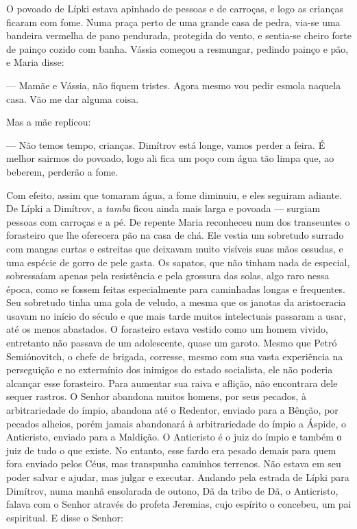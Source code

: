 O povoado de Lípki estava apinhado de pessoas e de carroças, e logo as
crianças ficaram com fome. Numa praça perto de uma grande casa de pedra,
via-se uma bandeira vermelha de pano pendurada, protegida do vento, e
sentia-se cheiro forte de painço cozido com banha. Vássia começou a
resmungar, pedindo painço e pão, e Maria disse:

--- Mamãe e Vássia, não fiquem tristes. Agora mesmo vou pedir esmola
naquela casa. Vão me dar alguma coisa.

Mas a mãe replicou:

--- Não temos tempo, crianças. Dimítrov está longe, vamos perder a
feira. É melhor sairmos do povoado, logo ali fica um poço com água tão
limpa que, ao beberem, perderão a fome.

Com efeito, assim que tomaram água, a fome diminuiu, e eles seguiram
adiante. De Lípki a Dimítrov, a \emph{tamba} ficou ainda mais larga e
povoada --- surgiam pessoas com carroças e a pé. De repente Maria
reconheceu num dos transeuntes o forasteiro que lhe oferecera pão na
casa de chá. Ele vestia um sobretudo surrado com mangas curtas e
estreitas que deixavam muito visíveis suas mãos ossudas, e uma espécie
de gorro de pele gasta. Os sapatos, que não tinham nada de especial,
sobressaíam apenas pela resistência e pela grossura das solas, algo raro
nessa época, como se fossem feitas especialmente para caminhadas longas
e frequentes. Seu sobretudo tinha uma gola de veludo, a mesma que os
janotas da aristocracia usavam no início do século e que mais tarde
muitos intelectuais passaram a usar, até os menos abastados. O
forasteiro estava vestido como um homem vivido, entretanto não passava
de um adolescente, quase um garoto. Mesmo que Petró Semiónovitch, o
chefe de brigada, corresse, mesmo com sua vasta experiência na
perseguição e no extermínio dos inimigos do estado socialista, ele não
poderia alcançar esse forasteiro. Para aumentar sua raiva e aflição, não
encontrara dele sequer rastros. O Senhor abandona muitos homens, por
seus pecados, à arbitrariedade do ímpio, abandona até o Redentor,
enviado para a Bênção, por pecados alheios, porém jamais abandonará à
arbitrariedade do ímpio a Áspide, o Anticristo, enviado para a Maldição.
O Anticristo é o juiz do ímpio е também о juiz de tudo o que existe. No
entanto, esse fardo era pesado demais para quem fora enviado pelos Céus,
mas transpunha caminhos terrenos. Não estava em seu poder salvar e
ajudar, mas julgar e executar. Andando pela estrada de Lípki para
Dimítrov, numa manhã ensolarada de outono, Dã da tribo de Dã, o
Anticristo, falava com o Senhor através do profeta Jeremias, cujo
espírito o concebeu, um pai espiritual. E disse o Senhor:

